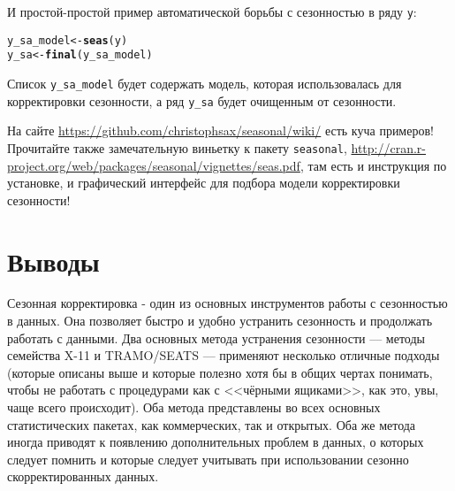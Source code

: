 \documentclass[final,pdftex]{../../template/epsilonj}\usepackage[]{graphicx}\usepackage[]{color}
\makeatletter
\newcommand{\hlstd}[1]{\textcolor[rgb]{0.345,0.345,0.345}{#1}}%
\newcommand{\hlkwb}[1]{\textcolor[rgb]{0.69,0.353,0.396}{#1}}%
\newcommand{\hlkwd}[1]{\textcolor[rgb]{0.737,0.353,0.396}{\textbf{#1}}}%
\newenvironment{kframe}{%
 \def\at@end@of@kframe{}%
 \ifinner\ifhmode%
  \def\at@end@of@kframe{\end{minipage}}%
  \begin{minipage}{\columnwidth}%
 \fi\fi%
 \def\FrameCommand##1{\hskip\@totalleftmargin \hskip-\fboxsep
 \colorbox{shadecolor}{##1}\hskip-\fboxsep
     \hskip-\linewidth \hskip-\@totalleftmargin \hskip\columnwidth}%
 \MakeFramed {\advance\hsize-\width
   \@totalleftmargin\z@ \linewidth\hsize
   \@setminipage}}%
 {\par\unskip\endMakeFramed%
 \at@end@of@kframe}
\newenvironment{knitrout}{}{} %
\makeatother
\begin{document}
И простой-простой пример автоматической борьбы с сезонностью в ряду \verb|y|:
\begin{knitrout}
\color{fgcolor}\begin{kframe}
\begin{alltt}
\hlstd{y_sa_model} \hlkwb{<-} \hlkwd{seas}\hlstd{(y)}
\hlstd{y_sa} \hlkwb{<-} \hlkwd{final}\hlstd{(y_sa_model)}
\end{alltt}
\end{kframe}
\end{knitrout}

Список \verb|y_sa_model| будет содержать модель, которая использовалась для корректировки сезонности, а ряд \verb|y_sa| будет очищенным от сезонности.

На сайте \url{https://github.com/christophsax/seasonal/wiki/} есть куча примеров! Прочитайте также замечательную виньетку к пакету \verb|seasonal|, \url{http://cran.r-project.org/web/packages/seasonal/vignettes/seas.pdf}, там есть и инструкция по установке, и графический интерфейс для подбора модели корректировки сезонности!


\section{Выводы}

Сезонная корректировка - один из основных инструментов работы с сезонностью в данных. Она позволяет быстро и удобно устранить сезонность и продолжать работать с данными. Два основных метода устранения сезонности --- методы семейства X-11 и TRAMO/SEATS --- применяют несколько отличные подходы (которые описаны выше и которые полезно хотя бы в общих чертах понимать, чтобы не работать с процедурами как с <<чёрными ящиками>>, как это, увы, чаще всего происходит). Оба метода представлены во всех основных статистических пакетах, как коммерческих, так и открытых. Оба же метода иногда приводят к появлению дополнительных проблем в данных, о которых следует помнить и которые следует учитывать при использовании сезонно скорректированных данных.
\end{document}
